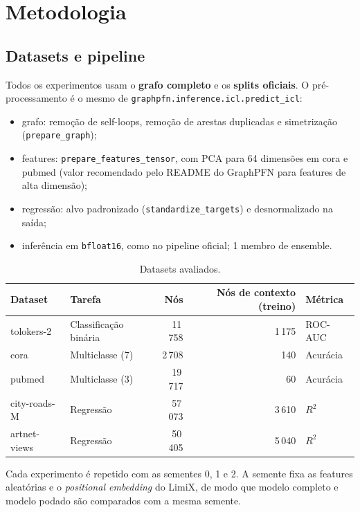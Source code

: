 \documentclass[11pt,a4paper]{article}
\begin{document}
\section{Metodologia}

\subsection{Datasets e pipeline}

Todos os experimentos usam o \textbf{grafo completo} e os \textbf{splits oficiais}. O pré-processamento é o mesmo de \texttt{graphpfn.inference.icl.predict\_icl}:
\begin{itemize}
  \item grafo: remoção de self-loops, remoção de arestas duplicadas e simetrização (\texttt{prepare\_graph});
  \item features: \texttt{prepare\_features\_tensor}, com PCA para 64 dimensões em cora e pubmed (valor recomendado pelo README do GraphPFN para features de alta dimensão);
  \item regressão: alvo padronizado (\texttt{standardize\_targets}) e desnormalizado na saída;
  \item inferência em \texttt{bfloat16}, como no pipeline oficial; 1 membro de ensemble.
\end{itemize}

\begin{table}[H]
\centering
\caption{Datasets avaliados.}
\label{tab:datasets}
\begin{tabular}{@{}llrrl@{}}
\toprule
Dataset & Tarefa & Nós & Nós de contexto (treino) & Métrica \\
\midrule
tolokers-2   & Classificação binária & 11\,758 & 1\,175 & ROC-AUC \\
cora         & Multiclasse (7)       & 2\,708  & 140    & Acurácia \\
pubmed       & Multiclasse (3)       & 19\,717 & 60     & Acurácia \\
city-roads-M & Regressão             & 57\,073 & 3\,610 & $R^2$ \\
artnet-views & Regressão             & 50\,405 & 5\,040 & $R^2$ \\
\bottomrule
\end{tabular}
\end{table}

Cada experimento é repetido com as sementes 0, 1 e 2. A semente fixa as features aleatórias e o \emph{positional embedding} do LimiX, de modo que modelo completo e modelo podado são comparados com a mesma semente.
\end{document}
